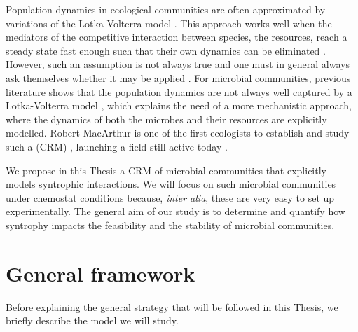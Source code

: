 \documentclass[12pt, titlepage]{report}
\begin{document}
Population dynamics in ecological communities are often approximated by variations of the Lotka-Volterra model \cite{lotka_analytical_1920}. This approach works well when the mediators of the competitive interaction between species, \ie the resources, reach a steady state fast enough such that their own dynamics can be eliminated \cite{momeni_lotka-volterra_2017}. However, such an assumption is not always true and one must in general always ask themselves whether it may be applied \cite{odwyer_whence_2018}. For microbial communities, previous literature shows that the population dynamics are not always well captured by a Lotka-Volterra model \cite{momeni_lotka-volterra_2017}, which explains the need of a more mechanistic approach, where the dynamics of both the microbes and their resources are explicitly modelled. Robert MacArthur is one of the first ecologists to establish and study such a  (CRM) \cite{macarthur_species_1970}, launching a field still active today \cite{brunner_metabolite_2019}.

We propose in this Thesis a CRM of microbial communities that explicitly models syntrophic interactions. We will focus on such microbial communities under chemostat conditions because, \textit{inter alia}, these are very easy to set up experimentally.
The general aim of our study is to determine and quantify how syntrophy impacts the feasibility and the stability of microbial communities.

\newpage
\section{General framework}
Before explaining the general strategy that will be followed in this Thesis, we briefly describe the model we will study.
\end{document}
